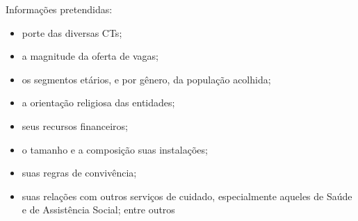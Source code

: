 

\begin{block}{Informações pretendidas:}
	
\begin{itemize}
	\item porte das diversas CTs;
	\item a magnitude da oferta de vagas;
	\item os segmentos etários, e por gênero, da população acolhida;
	\item a orientação religiosa das entidades;
	\item seus recursos financeiros;
	\item o tamanho e a composição suas instalações;
	\item suas regras de convivência;
	\item suas relações com outros serviços de cuidado, especialmente aqueles de Saúde e de Assistência Social; entre outros
\end{itemize}

\end{block}
